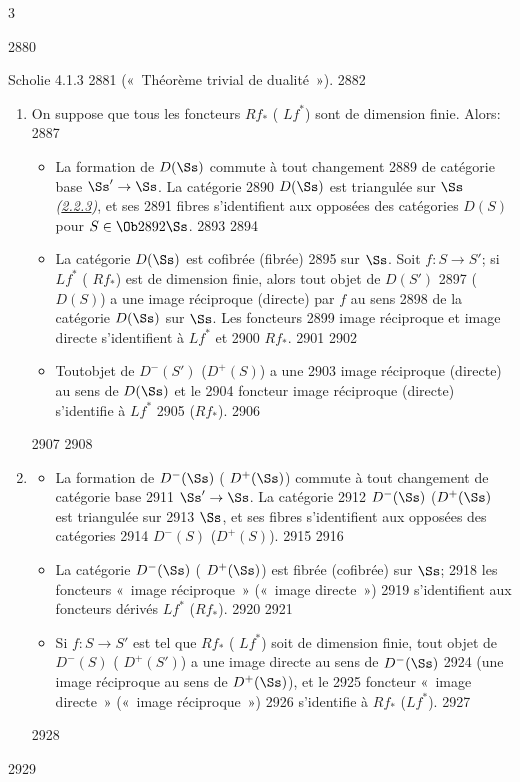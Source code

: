 3	\documentclass[10pt]{../fichiers-configuration-latex/smfart}
\begin{document}
  2880	\begin{enonce*}{Scholie 4.1.3}
  2881	(« Théorème trivial de dualité »).
  2882	\begin{enumerate}
  2883	\renewcommand{\theenumi}{\alph{enumi}}
  2884	\renewcommand{\labelenumi}{(\theenumi)}
  2885	\item On suppose que tous les foncteurs $Rf_{\ast}$ (	$Lf^{\ast}$) sont de dimension finie. Alors:
  2887	\begin{itemize}
  2888	\item[(i)] La formation de $D(\Ss)$ commute à tout changement
  2889	de catégorie base $\Ss'\rightarrow \Ss$. La catégorie
  2890	$D(\Ss)$ est triangulée sur $\Ss$ \emph{(\hyperref[XVII.def2.2.3]{2.2.3})}, et ses
  2891	fibres s'identifient aux opposées des catégories $D(S)$ pour $S\in \Ob
  2892	\Ss$.
  2893	
  2894	\item[(ii)] La catégorie $D(\Ss)$ est cofibrée (\resp fibrée)
  2895	sur $\Ss$. Soit $f:S\rightarrow S'$; si $Lf^{\ast}$ (	$Rf_{\ast}$) est de dimension finie, alors tout objet de $D(S')$
  2897	(\resp $D(S)$) a une image réciproque (\resp directe) par $f$ au sens
  2898	de la catégorie $D(\Ss)$ sur $\Ss$. Les foncteurs
  2899	image réciproque et image directe s'identifient à $Lf^{\ast}$ et
  2900	$Rf_{\ast}$.
  2901	
  2902	\item[(iii)] Tout\pageoriginale objet de $D^{-}(S')$ (\resp $D^{+}(S)$) a une
  2903	image réciproque (\resp directe) au sens de $D(\Ss)$ et le
  2904	foncteur image réciproque (\resp directe) s'identifie à $Lf^{\ast}$
  2905	(\resp $Rf_{\ast}$).
  2906	\end{itemize}
  2907	
  2908	\item \begin{itemize}
  2909	\item[(i)] La formation de $D^{-}(\Ss)$ (	$D^{+}(\Ss)$) commute à tout changement de catégorie base
  2911	$\Ss'\rightarrow \Ss$. La catégorie
  2912	$D^{-}(\Ss)$ (\resp $D^{+}(\Ss)$ est triangulée sur
  2913	$\Ss$, et ses fibres s'identifient aux opposées des catégories
  2914	$D^{-}(S)$ (\resp $D^{+}(S)$).
  2915	
  2916	\item[(ii)] La catégorie $D^{-}(\Ss)$ (	$D^{+}(\Ss)$) est fibrée (\resp cofibrée) sur $\Ss$;
  2918	les foncteurs « image réciproque »  (\resp « image directe »)
  2919	s'identifient aux foncteurs dérivés $Lf^{\ast}$ (\resp $Rf_{\ast}$).
  2920	
  2921	\item[(iii)] Si $f:S\rightarrow S'$ est tel que $Rf_{\ast}$ (	$Lf^{\ast}$) soit de dimension finie, tout objet de $D^{-}(S)$ (	$D^{+}(S')$) a une image directe au sens de $D^{-}(\Ss)$
  2924	(\resp une image réciproque au sens de $D^{+}(\Ss)$), et le
  2925	foncteur « image directe »  (\resp « image réciproque »)
  2926	s'identifie à $Rf_{\ast}$ (\resp $Lf^{\ast}$).
  2927	\end{itemize}
  2928	\end{enumerate}
  2929	\end{enonce*}
\end{document}
